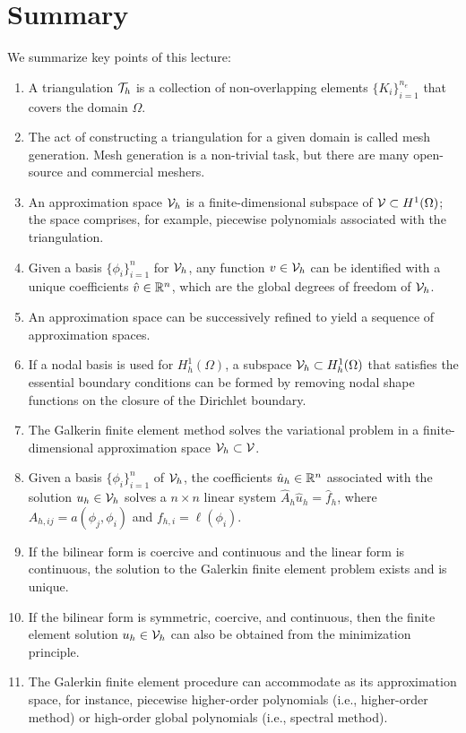 \section{Summary}
We summarize key points of this lecture:
\begin{enumerate}
\item A triangulation $\mathcal{T}_h$ is a collection of non-overlapping elements $\{K_i\}_{i=1}^{n_e}$ that covers the domain $\Omega$.
\item The act of constructing a triangulation for a given domain is called mesh generation. Mesh generation is a non-trivial task, but there are many open-source and commercial meshers.
\item An approximation space $\mathcal{V}_h$ is a finite-dimensional subspace of $\mathcal{V} \subset H^1(\Omega)$; the space comprises, for example, piecewise polynomials associated with the triangulation.
\item Given a basis $\{ \phi_i \}_{i=1}^n$ for $\mathcal{V}_h$, any function $v \in \mathcal{V}_h$ can be identified with a unique coefficients $\hat v \in \mathbb{R}^n$, which are the global degrees of freedom of $\mathcal{V}_h$.
\item An approximation space can be successively refined to yield a sequence of approximation spaces.
\item If a nodal basis is used for $H^1_h(\Omega)$, a subspace $\mathcal{V}_h \subset H^1_h(\Omega)$ that satisfies the essential boundary conditions can be formed by removing nodal shape functions on the closure of the Dirichlet boundary.
\item The Galkerin finite element method solves the variational problem in a finite-dimensional approximation space $\mathcal{V}_h \subset \mathcal{V}$.
\item Given a basis $\{\phi_i\}_{i=1}^n$ of $\mathcal{V}_h$, the coefficients $\hat u_h \in \mathbb{R}^n$ associated with the solution $u_h \in \mathcal{V}_h$ solves a $n \times n$ linear system $\hat A_h \hat u_h = \hat f_h$, where $A_{h,ij} = a(\phi_j,\phi_i)$ and $f_{h,i} = \ell(\phi_i)$.
\item If the bilinear form is coercive and continuous and the linear form is continuous, the solution to the Galerkin finite element problem exists and is unique.
\item If the bilinear form is symmetric, coercive, and continuous, then the finite element solution $u_h \in \mathcal{V}_h$ can also be obtained from the minimization principle.
\item The Galerkin finite element procedure can accommodate as its approximation space, for instance, piecewise higher-order polynomials (i.e., higher-order method) or high-order global polynomials (i.e., spectral method).
\end{enumerate}
